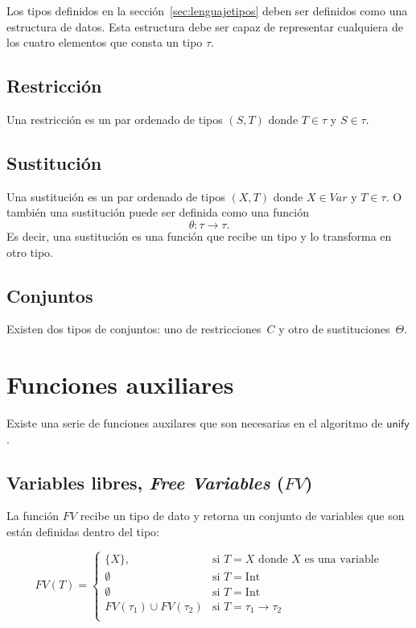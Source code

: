 \documentclass{article}
\newcommand{\ms}[1]{\mathsf{#1}}
\theoremstyle{definition}
\begin{document}
Los tipos definidos en la sección~\ref{sec:lenguajetipos} deben ser
definidos como una estructura de datos. Esta estructura debe ser capaz
de representar cualquiera de los cuatro elementos que consta un tipo
$\tau$.

\subsection{Restricción}
\label{sec:estrurest}

Una restricción es un par ordenado de tipos $(S,T)$ donde $T \in \tau$
y $S \in \tau$.

\subsection{Sustitución}
\label{sec:estrsust}

Una sustitución es un par ordenado de tipos $(X,T)$ donde $X \in Var$
y $T \in \tau$. O también una sustitución puede ser definida como una
función
\begin{equation*}
  \theta : \tau \to \tau.
\end{equation*}
Es decir, una sustitución es una función que recibe un tipo y lo
transforma en otro tipo.

\subsection{Conjuntos}
\label{sec:conjuntos}

Existen dos tipos de conjuntos: uno de restricciones~$C$ y otro de
sustituciones~$\Theta$.


\section{Funciones auxiliares}
\label{sec:funaux}

Existe una serie de funciones auxilares que son necesarias en el
algoritmo de $\ms{unify}$.

\subsection{Variables libres, \emph{Free Variables} ($FV$) }
\label{sec:fv}

La función $FV$ recibe un tipo de dato y retorna un conjunto de
variables que son están definidas dentro del tipo:

\[
  FV(T) =
  \begin{cases}
    \{X\}, & \text{si $T = X$ donde $X$ es una variable} \\
    \emptyset & \text{si $T = \text{Int}$} \\
    \emptyset & \text{si $T = \text{Int}$} \\
    FV(\tau_1) \cup FV(\tau_2) & \text{si $T = \tau_1 \to \tau_2$} \\
  \end{cases}
\]
\end{document}
